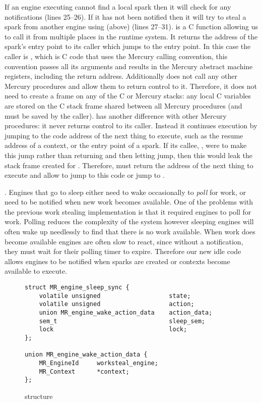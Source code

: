 If an engine executing \idle cannot find a local spark then it will
check for any notifications (lines 25--26).
If it has not been notified then it will try to steal a spark from another
engine using \trystealspark (above) (lines 27--31).
\trystealspark is a C function allowing us to call it from multiple places
in the runtime system.
It returns the address of the spark's entry point to its caller which jumps
to the entry point.
In this case the caller is \idle,
which is C code that uses the Mercury calling convention,
this convention passes all its arguments and results in the Mercury abstract
machine registers, including the return address.
Additionally \idle does not call any other Mercury procedures and allow them
to return control to it.
Therefore, it does not need to create a frame on any of the C or Mercury stacks:
any local C variables are stored on the C stack frame shared between all
Mercury procedures (and must be saved by the caller).
\idle has another difference with other Mercury procedures:
it never returns control to its caller.
Instead it continues execution by jumping to the code address of the next
thing to execute,
such as the resume address of a context,
or the entry point of a spark.
If its callee, \trystealspark, were to make this jump rather than
returning and then letting \idle jump,
then this would leak the stack frame created for \trystealspark.
Therefore, \trystealspark must return the address of the next thing to
execute and allow \idle to jump to this code or jump to \sleep.

.
Engines that go to sleep either need to wake occasionally to \emph{poll} for
work,
or need to be notified when new work becomes available.
One of the problems with the previous work stealing implementation is
that it required engines to poll for work.
Polling reduces the complexity of the system however
sleeping engines will often wake up needlessly to find that there is no
work available.
When work does become available engines are often slow to react,
since without a notification, they must wait for their polling timer to
expire.
Therefore our new idle code allows engines to be notified when 
sparks are created or contexts become available to execute.

\begin{figure}
\begin{verbatim}
struct MR_engine_sleep_sync {
    volatile unsigned                   state;
    volatile unsigned                   action;
    union MR_engine_wake_action_data    action_data;
    sem_t                               sleep_sem;
    lock                                lock;
};

union MR_engine_wake_action_data {
    MR_EngineId     worksteal_engine;
    MR_Context      *context;
};
\end{verbatim}
\caption{\enginesleepsync structure}
\label{fig:engine_sleep_sync}
\end{figure}

